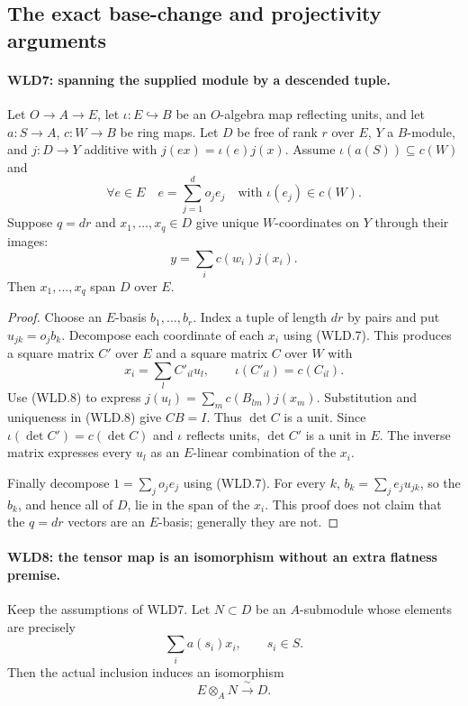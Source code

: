 \subsection{The exact base-change and projectivity arguments}

\paragraph{WLD7: spanning the supplied module by a descended tuple.}
\label{claim:WLD7}
Let $O\to A\to E$, let $\iota:E\hookrightarrow B$ be an $O$-algebra
map reflecting units, and let $a:S\to A$, $c:W\to B$ be ring maps.
Let $D$ be free of rank $r$ over $E$, $Y$ a $B$-module, and
$j:D\to Y$ additive with $j(ex)=\iota(e)j(x)$. Assume
$\iota(a(S))\subseteq c(W)$ and
\[
 \forall e\in E\quad
 e=\sum_{j=1}^d o_je_j\quad\text{with }\iota(e_j)\in c(W).
                                                               \tag{WLD.7}
\]
Suppose $q=dr$ and $x_1,\ldots,x_q\in D$ give unique $W$-coordinates
on $Y$ through their images:
\[
                    y=\sum_i c(w_i)j(x_i).
                                                               \tag{WLD.8}
\]
Then $x_1,\ldots,x_q$ span $D$ over $E$.

\begin{proof}
Choose an $E$-basis $b_1,\ldots,b_r$. Index a tuple of length $dr$
by pairs and put $u_{jk}=o_jb_k$. Decompose each coordinate of
each $x_i$ using (WLD.7). This produces a square matrix $C'$ over
$E$ and a square matrix $C$ over $W$ with
\[
             x_i=\sum_l C'_{il}u_l,\qquad
                         \iota(C'_{il})=c(C_{il}).
\]
Use (WLD.8) to express $j(u_l)=\sum_m c(B_{lm})j(x_m)$.
Substitution and uniqueness in (WLD.8) give $CB=I$.
Thus $\det C$ is a unit. Since
$\iota(\det C')=c(\det C)$ and $\iota$ reflects units,
$\det C'$ is a unit in $E$. The inverse matrix expresses every
$u_l$ as an $E$-linear combination of the $x_i$.

Finally decompose $1=\sum_j o_je_j$ using (WLD.7). For every $k$,
$b_k=\sum_j e_ju_{jk}$, so the $b_k$, and hence all of $D$, lie
in the span of the $x_i$. This proof does not claim that the
$q=dr$ vectors are an $E$-basis; generally they are not.
\end{proof}

\paragraph{WLD8: the tensor map is an isomorphism without an extra flatness premise.}
\label{claim:WLD8}
Keep the assumptions of WLD7. Let $N\subset D$ be an $A$-submodule
whose elements are precisely
\[
                        \sum_i a(s_i)x_i,\qquad s_i\in S.
                                                               \tag{WLD.9}
\]
Then the actual inclusion induces an isomorphism
\[
                         E\otimes_AN\xrightarrow{\ \sim\ }D.
                                                               \tag{WLD.10}
\]

